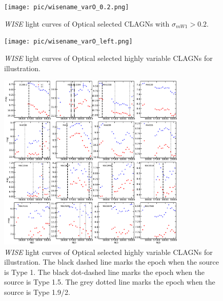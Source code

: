 \begin{figure}
\centering
	\texttt{[image: pic/wisename\_varO\_0.2.png]}
    \caption{{\it WISE} light curves of Optical selected CLAGNs with $\sigma_{m W1} > 0.2$. }
    \label{fig:O-CLAGN-lc}
\end{figure}


\begin{figure}
\centering
	\texttt{[image: pic/wisename\_varO\_left.png]}
    \caption{{\it WISE} light curves of Optical selected highly variable CLAGNs for illustration.} 
    \label{fig:O-CLAGN-lc-left}
\end{figure}


\begin{figure}
\centering
	\includegraphics[width=0.8\textwidth]{pic/wisename_varO_mag0.4.png}
    \caption{{\it WISE} light curves of Optical selected highly variable CLAGNs for illustration. The black dashed line marks the epoch when the source is Type 1. The black dot-dashed line marks the epoch when the source is Type 1.5. The grey dotted line marks the epoch when the source is Type 1.9/2.} 
    \label{fig:O-CLAGN-lc}
\end{figure}


